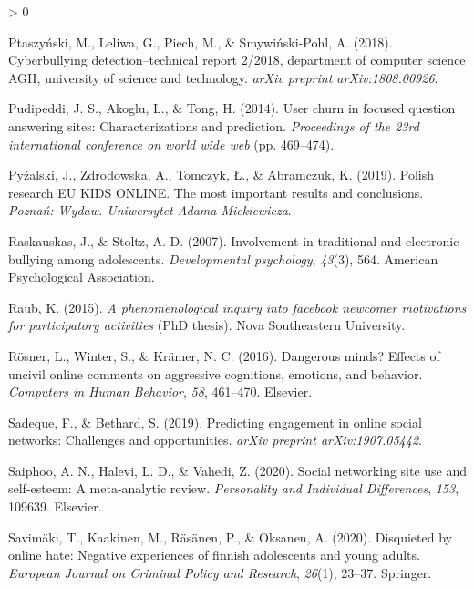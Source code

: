\documentclass[
  10pt,
  dvipsnames]{scrartcl}
\newlength{\cslhangindent}
\newenvironment{CSLReferences}[2] %
 {%
  \setlength{\parindent}{0pt}
  \ifodd #1 \everypar{\setlength{\hangindent}{\cslhangindent}}\ignorespaces\fi
  \ifnum #2 > 0
  \setlength{\parskip}{#2\baselineskip}
  \fi
 }%
 {}
\begin{document}
\begin{CSLReferences}{1}{0}
\leavevmode\hypertarget{ref-ptaszynski2018cyberbullying}{}%
Ptaszyński, M., Leliwa, G., Piech, M., \& Smywiński-Pohl, A. (2018).
Cyberbullying detection--technical report 2/2018, department of computer
science AGH, university of science and technology. \emph{arXiv preprint
arXiv:1808.00926}.

\leavevmode\hypertarget{ref-pudipeddi2014user}{}%
Pudipeddi, J. S., Akoglu, L., \& Tong, H. (2014). User churn in focused
question answering sites: Characterizations and prediction.
\emph{Proceedings of the 23rd international conference on world wide
web} (pp. 469--474).

\leavevmode\hypertarget{ref-pyzalski2019polish}{}%
Pyżalski, J., Zdrodowska, A., Tomczyk, Ł., \& Abramczuk, K. (2019).
Polish research EU KIDS ONLINE. The most important results and
conclusions. \emph{Pozna{ń}: Wydaw. Uniwersytet Adama Mickiewicza}.

\leavevmode\hypertarget{ref-raskauskas2007involvement}{}%
Raskauskas, J., \& Stoltz, A. D. (2007). Involvement in traditional and
electronic bullying among adolescents. \emph{Developmental psychology},
\emph{43}(3), 564. American Psychological Association.

\leavevmode\hypertarget{ref-raub2015phenomenological}{}%
Raub, K. (2015). \emph{A phenomenological inquiry into facebook newcomer
motivations for participatory activities} (PhD thesis). Nova
Southeastern University.

\leavevmode\hypertarget{ref-rosner2016dangerous}{}%
Rösner, L., Winter, S., \& Krämer, N. C. (2016). Dangerous minds?
Effects of uncivil online comments on aggressive cognitions, emotions,
and behavior. \emph{Computers in Human Behavior}, \emph{58}, 461--470.
Elsevier.

\leavevmode\hypertarget{ref-sadeque2019predicting}{}%
Sadeque, F., \& Bethard, S. (2019). Predicting engagement in online
social networks: Challenges and opportunities. \emph{arXiv preprint
arXiv:1907.05442}.

\leavevmode\hypertarget{ref-saiphoo2020social}{}%
Saiphoo, A. N., Halevi, L. D., \& Vahedi, Z. (2020). Social networking
site use and self-esteem: A meta-analytic review. \emph{Personality and
Individual Differences}, \emph{153}, 109639. Elsevier.

\leavevmode\hypertarget{ref-savimaki2020disquieted}{}%
Savimäki, T., Kaakinen, M., Räsänen, P., \& Oksanen, A. (2020).
Disquieted by online hate: Negative experiences of finnish adolescents
and young adults. \emph{European Journal on Criminal Policy and
Research}, \emph{26}(1), 23--37. Springer.


\end{CSLReferences}
\end{document}
